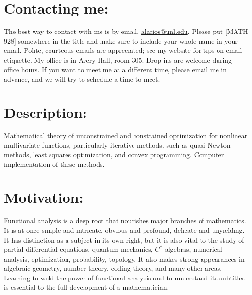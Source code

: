 \documentclass[margin]{res}
\theoremstyle{plain}
\theoremstyle{definition}
\theoremstyle{remark}
\begin{document}
\begin{resume}
\section{Contacting me:}
The best way to contact with me is by email, \url{alarios@unl.edu}.  Please put [MATH 928] somewhere in the title and make sure to include your whole name in your email. Polite, courteous emails are appreciated; see my website for tips on email etiquette.  My office is in Avery Hall, room 305. Drop-ins are welcome during office hours.  If you want to meet me at a different time, please email me in advance, and we will try to schedule a time to meet.


\section{Description:} Mathematical theory of unconstrained and constrained optimization for nonlinear multivariate functions, particularly iterative methods, such as quasi-Newton methods, least squares optimization, and convex programming.  Computer implementation of these methods.


 \section{Motivation:} Functional analysis is a deep root that nourishes major branches of mathematics.  It is at once simple and intricate, obvious and profound, delicate and unyielding.    It has distinction as a subject in its own right, but it is also vital to the study of partial differential equations, quantum mechanics, $C^*$ algebras, numerical analysis, optimization, probability, topology.  It also makes strong appearances in algebraic geometry, number theory, coding theory, and many other areas.  Learning to weld the power of functional analysis and to understand its subtitles is essential to the full development of a mathematician.


\end{resume}
\end{document}
